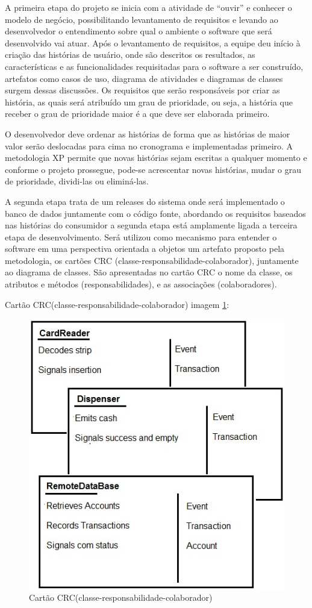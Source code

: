 \documentclass{automatextcc}
\begin{document}
A primeira etapa do projeto se inicia com a atividade de “ouvir” e conhecer o modelo de negócio, possibilitando  levantamento de requisitos e levando ao desenvolvedor o entendimento sobre qual o ambiente o software que será desenvolvido vai atuar. Após o levantamento de requisitos, a equipe deu início à criação das histórias de usuário, onde são descritos os resultados, as características e as funcionalidades requisitadas para o software a ser construído, artefatos como casos de uso, diagrama de atividades e diagramas de classes  surgem dessas discussões. Os requisitos que serão responsáveis por criar as história, as quais será atribuído um grau de prioridade, ou seja, a história que receber o grau de prioridade maior é a que deve ser elaborada primeiro. 

O desenvolvedor deve ordenar as histórias de forma que as histórias de maior valor serão deslocadas para cima no cronograma e implementadas primeiro. A metodologia XP permite que novas histórias sejam escritas a qualquer momento e conforme o projeto prossegue, pode-se acrescentar novas histórias, mudar o grau de prioridade, dividi-las ou eliminá-las. 

A segunda etapa trata de um releases do sistema onde será implementado o banco de dados juntamente com o código fonte,  abordando os requisitos baseados nas histórias do consumidor a segunda etapa está amplamente ligada a terceira etapa de desenvolvimento.  Será utilizou como mecanismo para entender o software em uma perspectiva orientada a objetos um artefato proposto pela metodologia, os cartões CRC (classe-responsabilidade-colaborador), juntamente ao diagrama de classes. São apresentadas no cartão CRC o nome da classe, os atributos e métodos (responsabilidades), e as associações (colaboradores).  

Cartão CRC(classe-responsabilidade-colaborador) imagem \ref{img2}: 
 \begin{figure}[h!]
    \centering
	\includegraphics[scale=0.7]{CRC}
	\caption{Cartão CRC(classe-responsabilidade-colaborador)}
	\label{img2}
\end{figure}
\end{document}
